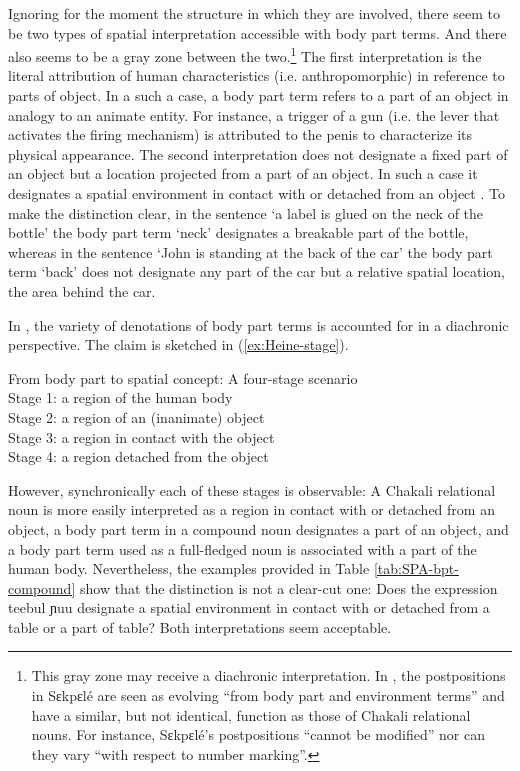 \begin{exe}
\begin{exe}
\begin{exe}
{\begin{exe}
\begin{exe}
\begin{exe}
\begin{exe}
\begin{exe}
\begin{exe}
\begin{table}[h]
\end{table} 

Ignoring for the moment the structure in which they are involved, there seem to
be two types
of spatial interpretation accessible with body part terms. And there also seems
to be a gray zone between the two.\footnote{This gray zone may receive a
diachronic interpretation.  In
\citet[1072]{Amek07c},  the postpositions in Sɛkpɛlé are seen as evolving
``from body part and environment terms''  and have a similar, but not
identical, 
function as those of Chakali relational nouns. For instance, Sɛkpɛlé's  
postpositions ``cannot be modified'' nor can they vary ``with respect to number
 marking''.} The first interpretation is the literal
attribution of human
characteristics (i.e. anthropomorphic) in  reference to parts of object. In a
such a
case, a body part term refers to a part of an object in analogy to an animate
entity. For instance, a trigger of a gun (i.e. the lever that activates the
firing
mechanism) is  attributed to the penis to characterize its physical appearance.
The
second interpretation does not designate a fixed part of an object
but a location projected from a part of an object.  In such a case it designates
a spatial environment in contact with or detached from an object
\citep[44]{Hein97}. To make the
distinction clear,  in the sentence `a label is glued on the neck of the bottle'
the body part term `neck' designates a breakable part of the bottle, 
whereas
in the sentence `John is standing at the back of the car' the body part term
`back' does not designate any part of the car but a relative spatial
location, the area behind the car. 


 In \citet[44]{Hein97}, the variety of denotations of body part terms is
accounted for in a diachronic perspective. The  claim is sketched in
(\ref{ex:Heine-stage}).


\ea\label{ex:Heine-stage}{\rm From body part to spatial concept: A four-stage
scenario \citep[44]{Hein97}}\\
Stage 1: a region of the human body\\
Stage 2: a region of an (inanimate) object\\
Stage 3: a region in contact with the object\\ 
Stage 4:  a region detached from the object\\
\z


However, synchronically each of these stages is observable: A  Chakali 
relational noun is more easily interpreted as  a region in contact with or
detached from an object, a body part term in a compound
noun designates
a part of an object, and a body part term used as
a full-fledged noun is associated with a part of the human body. 
Nevertheless, the examples provided in Table \ref{tab:SPA-bpt-compound} show
that the distinction is not a clear-cut one: Does the expression {\sls teebul 
ɲuu}
designate a spatial environment  in contact with or detached from a table or  a
part of table? Both interpretations seem acceptable.


\end{exe}
\end{exe}
\end{exe}
\end{exe}
\end{exe}
\end{exe}}
\end{exe}
\end{exe}
\end{exe}
